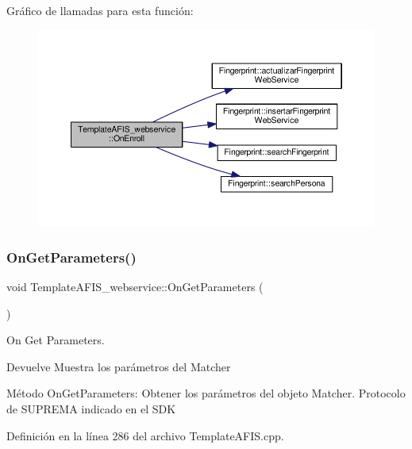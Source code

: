 Gráfico de llamadas para esta función\+:\nopagebreak
\begin{figure}[H]
\begin{center}
\leavevmode
\includegraphics[width=350pt]{classTemplateAFIS__webservice_a5fc2884ea75075e40a6056440021f27d_cgraph}
\end{center}
\end{figure}
\hypertarget{classTemplateAFIS__webservice_a40bd372e1a5b01d9bc2b4e1898be967f}{}\label{classTemplateAFIS__webservice_a40bd372e1a5b01d9bc2b4e1898be967f} 
\subsubsection{\texorpdfstring{On\+Get\+Parameters()}{OnGetParameters()}}
{\footnotesize\ttfamily void Template\+A\+F\+I\+S\+\_\+webservice\+::\+On\+Get\+Parameters (\begin{DoxyParamCaption}{ }\end{DoxyParamCaption})}



On Get Parameters. 

\begin{DoxyReturn}{Devuelve}
Muestra los parámetros del Matcher
\end{DoxyReturn}
Método On\+Get\+Parameters\+: Obtener los parámetros del objeto Matcher. Protocolo de S\+U\+P\+R\+E\+MA indicado en el S\+DK 

Definición en la línea 286 del archivo Template\+A\+F\+I\+S.\+cpp.

\hypertarget{classTemplateAFIS__webservice_ab66286f0a3f0702977a46332d3bce05d}{}\label{classTemplateAFIS__webservice_ab66286f0a3f0702977a46332d3bce05d} 
